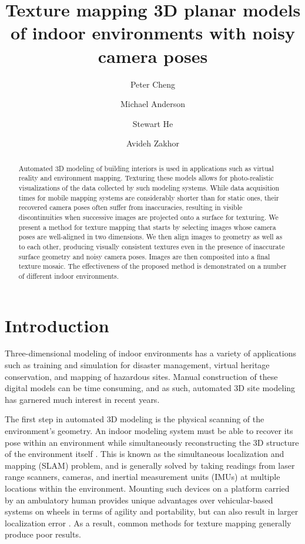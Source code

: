 \documentclass{llncs}
\title{Texture mapping 3D planar models of indoor environments with noisy camera poses}
\author{Peter Cheng \and Michael Anderson \and Stewart He \and Avideh Zakhor}
\institute{University of California, Berkeley\\ Berkeley CA 94720, USA}
\begin{document}
\maketitle

\begin{abstract}
  Automated 3D modeling of building interiors is used in applications
  such as virtual reality and environment mapping. Texturing these
  models allows for photo-realistic visualizations of the data
  collected by such modeling systems. While data acquisition times for
  mobile mapping systems are considerably shorter than for static
  ones, their recovered camera poses often suffer from inaccuracies,
  resulting in visible discontinuities when successive images are
  projected onto a surface for texturing. We present a method for
  texture mapping that starts by selecting images whose camera poses
  are well-aligned in two dimensions. We then align images to geometry
  as well as to each other, producing visually consistent textures
  even in the presence of inaccurate surface geometry and noisy camera
  poses. Images are then composited into a final texture mosaic. The
  effectiveness of the proposed method is demonstrated on a number of
  different indoor environments.

\end{abstract}



\section{Introduction}
\label{sec:introduction} %
Three-dimensional modeling of indoor environments has a variety of
applications such as training and simulation for disaster management,
virtual heritage conservation, and mapping of hazardous sites. Manual
construction of these digital models can be time consuming, and as
such, automated 3D site modeling has garnered much interest in recent
years.

The first step in automated 3D modeling is the physical scanning of
the environment's geometry. An indoor modeling system must be able to
recover its pose within an environment while simultaneously
reconstructing the 3D structure of the environment itself
\cite{chen2010indoor, hz, kua2012loopclosure, liu2010indoor}. This is known as the simultaneous localization and
mapping (SLAM) problem, and is generally solved by taking readings
from laser range scanners, cameras, and inertial measurement units
(IMUs) at multiple locations within the environment. Mounting such
devices on a platform carried by an ambulatory human provides unique
advantages over vehicular-based systems on wheels in terms of agility
and portability, but can also result in larger localization error
\cite{liu2010indoor}. As a result, common methods for texture mapping
generally produce poor results.
\end{document}

